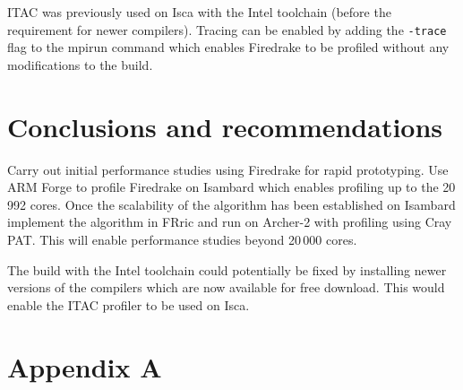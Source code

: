 \documentclass[a4paper,titlepage]{article}
\begin{document}
ITAC was previously used on Isca with the Intel toolchain (before the requirement for newer compilers). Tracing can be enabled by adding the \verb+-trace+ flag to the mpirun command which enables Firedrake to be profiled without any modifications to the build. 



\section{Conclusions and recommendations}
\label{section:conclusions}

Carry out initial performance studies using Firedrake for rapid prototyping. Use ARM Forge to profile Firedrake on Isambard which enables profiling up to the 20\,992 cores. Once the scalability of the algorithm has been established on Isambard implement the algorithm in FRric and run on Archer-2 with profiling using Cray PAT. This will enable performance studies beyond 20\,000 cores.

The build with the Intel toolchain could potentially be fixed by installing newer versions of the compilers which are now available for free download. This would enable the ITAC profiler to be used on Isca.

\pagebreak


\section*{Appendix A}
\label{appendixA}

\end{document}
